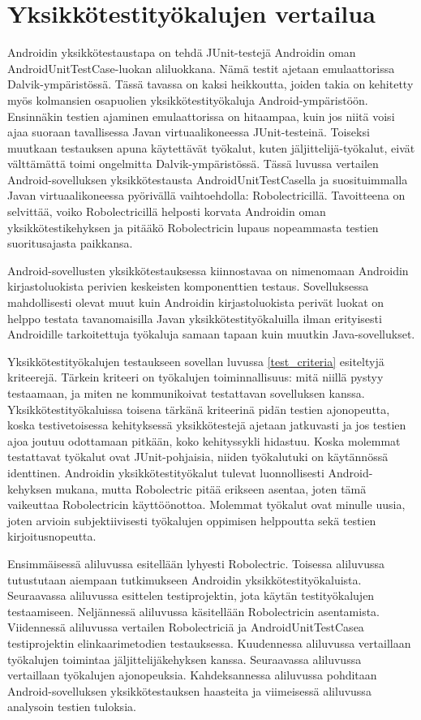\section{Yksikkötestityökalujen vertailua}

Androidin yksikkötestaustapa on tehdä JUnit-testejä Androidin oman AndroidUnitTestCase-luokan aliluokkana. Nämä testit ajetaan emulaattorissa Dalvik-ympäristössä. Tässä tavassa on kaksi heikkoutta, joiden takia on kehitetty myös kolmansien osapuolien yksikkötestityökaluja Android-ympäristöön. Ensinnäkin testien ajaminen emulaattorissa on hitaampaa, kuin jos niitä voisi ajaa suoraan tavallisessa Javan virtuaalikoneessa JUnit-testeinä. Toiseksi muutkaan testauksen apuna käytettävät työkalut, kuten jäljittelijä-työkalut, eivät välttämättä toimi ongelmitta Dalvik-ympäristössä. Tässä luvussa vertailen Android-sovelluksen yksikkötestausta AndroidUnitTestCasella ja suosituimmalla Javan virtuaalikoneessa pyörivällä vaihtoehdolla: Robolectricillä. Tavoitteena on selvittää, voiko Robolectricillä helposti korvata Androidin oman yksikkötestikehyksen ja pitääkö Robolectricin lupaus nopeammasta testien suoritusajasta paikkansa.

Android-sovellusten yksikkötestauksessa kiinnostavaa on nimenomaan Androidin kirjastoluokista perivien keskeisten komponenttien testaus. Sovelluksessa mahdollisesti olevat muut kuin Androidin kirjastoluokista perivät luokat on helppo testata tavanomaisilla Javan yksikkötestityökaluilla ilman erityisesti Androidille tarkoitettuja työkaluja samaan tapaan kuin muutkin Java-sovellukset.

Yksikkötestityökalujen testaukseen sovellan luvussa \ref{test_criteria} esiteltyjä kriteerejä. Tärkein kriteeri on työkalujen toiminnallisuus: mitä niillä pystyy testaamaan, ja miten ne kommunikoivat testattavan sovelluksen kanssa. Yksikkötestityökaluissa toisena tärkänä kriteerinä pidän testien ajonopeutta, koska testivetoisessa kehityksessä yksikkötestejä ajetaan jatkuvasti ja jos testien ajoa joutuu odottamaan pitkään, koko kehityssykli hidastuu. Koska molemmat testattavat työkalut ovat JUnit-pohjaisia, niiden työkalutuki on käytännössä identtinen. Androidin yksikkötestityökalut tulevat luonnollisesti Android-kehyksen mukana, mutta Robolectric pitää erikseen asentaa, joten tämä vaikeuttaa Robolectricin käyttöönottoa. Molemmat työkalut ovat minulle uusia, joten arvioin subjektiivisesti työkalujen oppimisen helppoutta sekä testien kirjoitusnopeutta.

Ensimmäisessä aliluvussa esitellään lyhyesti Robolectric. Toisessa aliluvussa tutustutaan aiempaan tutkimukseen Androidin yksikkötestityökaluista. Seuraavassa aliluvussa esittelen testiprojektin, jota käytän testityökalujen testaamiseen. Neljännessä aliluvussa käsitellään Robolectricin asentamista. Viidennessä aliluvussa vertailen Robolectriciä ja AndroidUnitTestCasea testiprojektin elinkaarimetodien testauksessa. Kuudennessa aliluvussa vertaillaan työkalujen toimintaa jäljittelijäkehyksen kanssa. Seuraavassa aliluvussa vertaillaan työkalujen ajonopeuksia. Kahdeksannessa aliluvussa pohditaan Android-sovelluksen yksikkötestauksen haasteita ja viimeisessä aliluvussa analysoin testien tuloksia.

